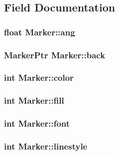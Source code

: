 \subsection{Field Documentation}
\subsubsection{\setlength{\rightskip}{0pt plus 5cm}float \bf{Marker::ang}}\label{structMarker_427e42d4473c7f272b4e7f8215ff2715}


\subsubsection{\setlength{\rightskip}{0pt plus 5cm}\bf{Marker\-Ptr} \bf{Marker::back}}\label{structMarker_39ddf75659203f850f66fe9966dfad50}


\subsubsection{\setlength{\rightskip}{0pt plus 5cm}int \bf{Marker::color}}\label{structMarker_b9ae31e3c514090e11013d17947906f8}


\subsubsection{\setlength{\rightskip}{0pt plus 5cm}int \bf{Marker::fill}}\label{structMarker_2eb93d4757c22d57a984042fbe8f5cd8}


\subsubsection{\setlength{\rightskip}{0pt plus 5cm}int \bf{Marker::font}}\label{structMarker_a1d570cf37becde625e6641330a38ed5}


\subsubsection{\setlength{\rightskip}{0pt plus 5cm}int \bf{Marker::linestyle}}\label{structMarker_e46e5d3a94b02932587bff40947de22b}


